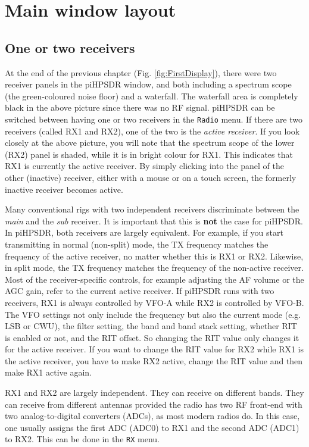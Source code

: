 \documentclass[12pt]{book}
\def\bltt#1{\texttt{\color{blue}#1}}
\def\pH{pi\-HPSDR\xspace}
\begin{document}
\chapter{Main window layout}

\section{One or two receivers}
At the end of the previous chapter (Fig. \ref{fig:FirstDisplay}),
there were two receiver panels in the
\pH window, and both including a spectrum scope
(the green-coloured noise floor) and a waterfall. The waterfall area
is completely black in the above picture since there was no RF signal.
\pH can be switched between having one or two receivers in the
\texttt{Radio} menu. If there are two receivers (called RX1 and RX2),
one of the two is the \textit{active receiver}. If you look closely
at the above picture, you will note that the spectrum scope of
the lower (RX2) panel is shaded, while it is in bright colour for RX1.
This indicates that RX1 is currently the active receiver. By simply
clicking into the panel of the other (inactive) receiver, either with
a mouse or on a touch screen, the formerly inactive receiver becomes
active.

Many conventional rigs with two independent receivers discriminate
between the \textit{main} and the \textit{sub} receiver. It is important that
this is \textbf{not} the case for \pH. In \pH, both  receivers are
largely equivalent. For example, if you start transmitting in
normal (non-split) mode, the TX frequency matches the frequency
of the active receiver, no matter whether this is RX1 or RX2.
Likewise, in split mode, the TX frequency matches the frequency
of the non-active receiver. Most of the receiver-specific controls,
for example adjusting the AF volume or the AGC gain, refer to the
current active receiver. If \pH runs with two receivers,
RX1 is always controlled by VFO-A while RX2 is controlled by VFO-B.
The VFO settings not only include the frequency but also the
current mode (e.g. LSB or CWU), the filter setting, the band and
band stack setting, whether RIT is enabled or not, and the RIT
offset. So changing the RIT value only changes it for the active
receiver. If you want  to change the RIT value for RX2 while RX1 is
the active receiver, you have to make RX2 active, change the RIT
value and then make RX1 active again.

RX1 and RX2 are largely independent. They can receive on different
bands. They can receive from different antennas provided the radio
has two RF front-end with two analog-to-digital converters (ADCs),
as most modern radios do. In this case, one usually
assigns the first ADC (ADC0) to RX1 and the second ADC (ADC1) to
RX2. This can be done in the \bltt{RX} menu.
\end{document}
